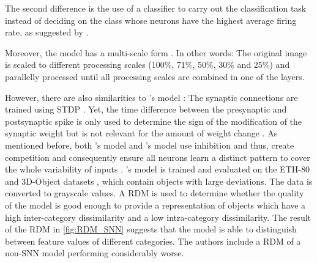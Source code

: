 The second difference is the use of a classifier to carry out the classification task 
instead of deciding on the class whose neurons have the highest average firing rate, 
as suggested by \authorsSNN{} \cite{SNN}.

Moreover, the model has a multi-scale form \cite{multi_scale_STDP}.
In other words: 
The original image is scaled to different processing scales (100\%, 71\%, 50\%, 30\% and 25\%) and parallelly processed until 
all processing scales are combined in one of the layers.

However, there are also similarities to \authorsSNN{}'s model \cite{SNN}:
The synaptic connections are trained using \ac{STDP} \cite{multi_scale_STDP,STDP_vis_feat}.
Yet, the time difference between the presynaptic and postsynaptic spike is only used to determine the sign of the modification of the synaptic weight 
but is not relevant for the amount of weight change \cite{STDP_vis_feat}.
As mentioned before, both \authorsmultiScaleSTDP{}'s model \cite{multi_scale_STDP} and \authorsSNN{}'s model \cite{SNN} use inhibition and thus, 
create competition and consequently ensure all neurons learn a distinct pattern to cover the whole variability of inputs \cite{STDP_vis_feat}.
%
\authorsmultiScaleSTDP{}'s model \cite{multi_scale_STDP} is trained and evaluated on the ETH-80 and 3D-Object datasets \cite{multi_scale_STDP}, which contain objects with large deviations.
The data is converted to grayscale values.
A \ac{RDM} is used to determine whether the quality of the model is good enough to provide a representation of objects which have a high inter-category dissimilarity and a low intra-category dissimilarity.
The result of the \ac{RDM} in \autoref{fig:RDM_SNN} suggests that the model is able to distinguish between feature values of different categories.
The authors include a \ac{RDM} of a non-\ac{SNN} model performing considerably worse.
%
